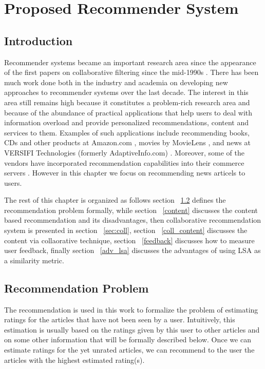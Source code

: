 
\chapter{Proposed Recommender System} %

\label{recommender} %



\section{Introduction}
Recommender systems became an important research area since the appearance of the first papers on collaborative filtering since the mid-1990s  \citep{recom_45} \citep{recom_86} \citep{recom_97}. There has been much work done both in the industry and academia on developing new approaches to recommender systems over the last decade. The interest in this area still remains high because it constitutes a problem-rich research area and because of the abundance of practical applications that help users to deal with information overload and provide personalized recommendations, content and services to them. Examples of such applications include recommending books, CDs and other products at Amazon.com \citep{recom_61}, movies by MovieLens \citep{recom_67}, and news at VERSIFI Technologies (formerly AdaptiveInfo.com) \citep{recom_14}. Moreover, some of the vendors have incorporated recommendation capabilities into their commerce servers \citep{recom_78}. However in this chapter we focus on recommending news articels to users.

The rest of this chapter is organized as follows section ~\ref{problem} defines the recommendation problem formally,  while section ~\ref{content} discusses the content based recommendation and its disadvantages, then collaborative recommendation system is presented in section ~\ref{sec:coll}, section ~\ref{coll_content} discusses the content via collaorative technique, section ~\ref{feedback} discusses how to measure user feedback, finally section ~\ref{adv_lsa} discusses the advantages of using LSA as a similarity metric.


\section{Recommendation Problem}\label{problem}
The recommendation is used in this work to formalize the problem of estimating ratings for the articles that have not been seen by a user. Intuitively, this estimation is usually based on the ratings given by this user to other articles and on some other information that will be formally described below. Once we can estimate ratings for the yet unrated articles, we can recommend to the user the articles with the highest estimated rating(s).

